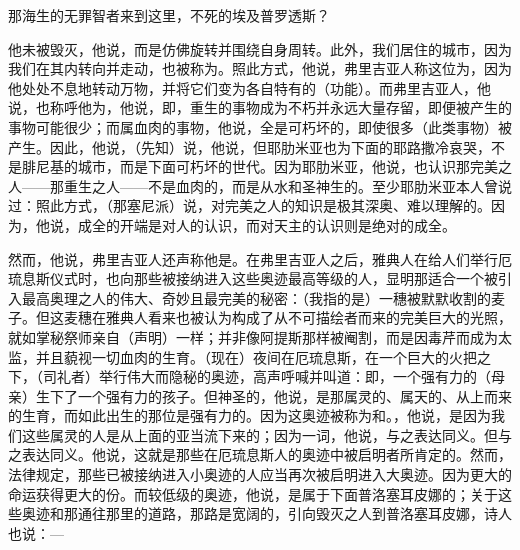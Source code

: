 那海生的无罪智者来到这里，\newline{}不死的埃及普罗透斯？\par

他未被毁灭，他说，而是仿佛旋转并围绕自身周转。此外，我们居住的城市，因为我们在其内转向并走动，也被称为。照此方式，他说，弗里吉亚人称这位为，因为他处处不息地转动万物，并将它们变为各自特有的（功能）。而弗里吉亚人，他说，也称呼他为，他说，即，重生的事物成为不朽并永远大量存留，即便被产生的事物可能很少；而属血肉的事物，他说，全是可朽坏的，即使很多（此类事物）被产生。因此，他说，（先知）说，他说，但耶肋米亚也为下面的耶路撒冷哀哭，不是腓尼基的城市，而是下面可朽坏的世代。因为耶肋米亚，他说，也认识那完美之人——那重生之人——不是血肉的，而是从水和圣神生的。至少耶肋米亚本人曾说过：照此方式，（那塞尼派）说，对完美之人的知识是极其深奥、难以理解的。因为，他说，成全的开端是对人的认识，而对天主的认识则是绝对的成全。\par

然而，他说，弗里吉亚人还声称他是。在弗里吉亚人之后，雅典人在给人们举行厄琉息斯仪式时，也向那些被接纳进入这些奥迹最高等级的人，显明那适合一个被引入最高奥理之人的伟大、奇妙且最完美的秘密：（我指的是）一穗被默默收割的麦子。但这麦穗在雅典人看来也被认为构成了从不可描绘者而来的完美巨大的光照，就如掌秘祭师亲自（声明）一样；并非像阿提斯那样被阉割，而是因毒芹而成为太监，并且藐视一切血肉的生育。（现在）夜间在厄琉息斯，在一个巨大的火把之下，（司礼者）举行伟大而隐秘的奥迹，高声呼喊并叫道：即，一个强有力的（母亲）生下了一个强有力的孩子。但神圣的，他说，是那属灵的、属天的、从上而来的生育，而如此出生的那位是强有力的。因为这奥迹被称为和。，他说，是因为我们这些属灵的人是从上面的亚当流下来的；因为一词，他说，与之表达同义。但与之表达同义。他说，这就是那些在厄琉息斯人的奥迹中被启明者所肯定的。然而，法律规定，那些已被接纳进入小奥迹的人应当再次被启明进入大奥迹。因为更大的命运获得更大的份。而较低级的奥迹，他说，是属于下面普洛塞耳皮娜的；关于这些奥迹和那通往那里的道路，那路是宽阔的，引向毁灭之人到普洛塞耳皮娜，诗人也说：—\par

